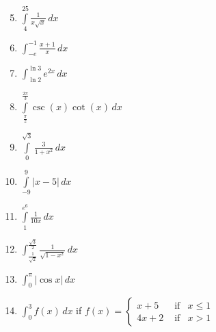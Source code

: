 \documentclass[12pt]{article}
\newif\ifans
\begin{document}
\begin{enumerate}
\setcounter{enumi}{4}

\item $\int\limits_{4}^{25} \frac{1}{x\sqrt{x}}\,dx$ 

\ifans{\fbox{$\frac{3}{5}$}} \fi

\item $\int_{-e}^{-1}{\frac{x+1}{x}} \,dx$

\ifans{\fbox{$-2+e$; Detailed Solution: \textcolor{blue}{\href{http://www.math.drexel.edu/classes/Calculus/resources/Math122HW/Solutions/122_04_FTC_06.pdf}{Here}}}} \fi

\item $\int_{\ln{2}}^{\ln{3}}e^{2x} \,dx$

\ifans{\fbox{$\frac{5}{2}$}} \fi

\item $\int\limits_{\frac{\pi}{2}}^{\frac{2\pi}{3}}\csc{(x)}\cot{(x)}\,dx$ 

\ifans{\fbox{$1-\frac{2}{\sqrt{3}}$}} \fi

\item $\int\limits_{0}^{\sqrt{3}}\frac{3}{1+x^2}\,dx$ 

\ifans{\fbox{$\pi$}} \fi

\item $\int\limits_{-9}^{9}|x-5|\,dx$ 

\ifans{\fbox{106}} \fi

\item $\int\limits^{e^{6}}_{1}\frac{1}{10 x}\,dx$ 

\ifans{\fbox{$\frac{3}{5}$}} \fi

\item $\int_{\frac{1}{\sqrt{2}}}^{\frac{\sqrt{3}}{2}} \frac{1}{\sqrt{1-x^2}} \,dx$ 

\ifans{\fbox{$\frac{\pi}{12}$}} \fi

\item $\int_{0}^{\pi} |\cos{x}| \,dx$

\ifans{\fbox{2; Video Solution: \textcolor{blue}{\href{https://www.youtube.com/watch?v=3M-TfaGLFnI}{https://www.youtube.com/watch?v=3M-TfaGLFnI}}}} \fi

\item $\int_0^3 f(x) \,dx$ if $f(x)=\left\{\begin{array}{lll}
x+5 & \text{  if} & x \leq 1\\
4x+2 & \text{  if} & x > 1
\end{array}\right.$

\ifans{\fbox{$\frac{51}{2}$}} \fi


\end{enumerate}
\end{document}
